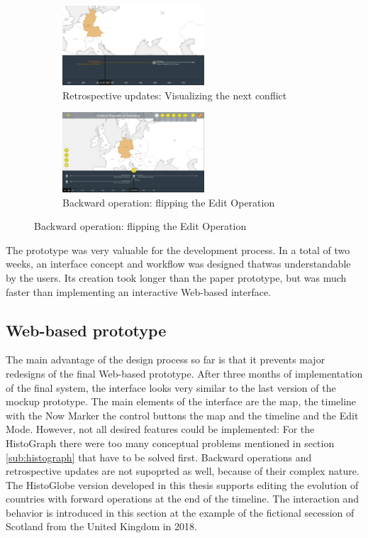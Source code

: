 \begin{figure}[ht]
\centering
\begin{subfigure}[b]{.5\textwidth}
  \centering
  \includegraphics[width=200px]{graphics/development/design_process/retrospective_update.png}
  \caption{Retrospective updates: Visualizing the next conflict}
  \label{sfig:retrospective_update}
\end{subfigure}%
\begin{subfigure}[b]{.5\textwidth}
  \centering
  \includegraphics[width=200px]{graphics/development/design_process/backward_change.png}
  \caption{Backward operation: flipping the Edit Operation}
  \label{sfig:backward_change}
\end{subfigure}
\label{fig:backward_change}
\end{figure}

The prototype was very valuable for the development process. In a total of two weeks, an interface concept and workflow was designed thatwas understandable by the users. Its creation took longer than the paper prototype, but was much faster than implementing an interactive Web-based interface.



\subsection{Web-based prototype} %
\label{sub:web_based_prototype}

The main advantage of the design process so far is that it prevents major redesigns of the final Web-based prototype. After three months of implementation of the final system, the interface looks very similar to the last version of the mockup prototype. The main elements of the interface are the map, the timeline with the Now Marker the control buttons the map and the timeline and the Edit Mode. However, not all desired features could be implemented: For the HistoGraph there were too many conceptual problems mentioned in section \ref{sub:histograph} that have to be solved first. Backward operations and retrospective updates are not supoprted as well, because of their complex nature. The HistoGlobe version developed in this thesis supports editing the evolution of countries with forward operations at the end of the timeline. The interaction and behavior is introduced in this section at the example of the fictional secession of Scotland from the United Kingdom in 2018.

